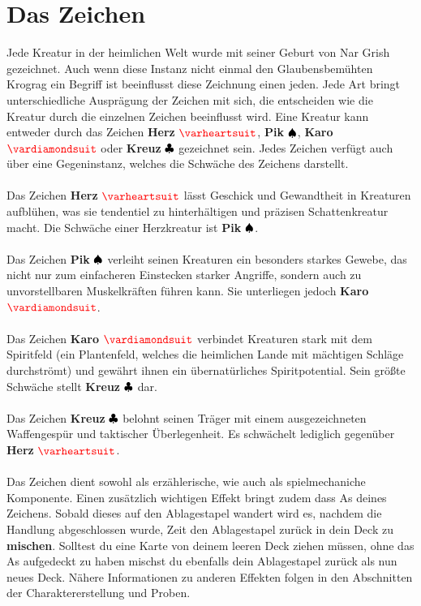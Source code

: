 \section{Das Zeichen}
Jede Kreatur in der heimlichen Welt wurde mit seiner Geburt von Nar Grish gezeichnet. Auch wenn diese Instanz nicht einmal den Glaubensbemühten Krograg ein Begriff ist beeinflusst diese Zeichnung einen jeden. Jede Art bringt unterschiedliche Ausprägung der Zeichen mit sich, die entscheiden wie die Kreatur durch die einzelnen Zeichen beeinflusst wird. Eine Kreatur kann entweder durch das Zeichen \textbf{Herz} $\Herz{}$, \textbf{Pik} ${\color{blue} }{\color{black}\spadesuit}$,  \textbf{Karo} $\Karo{}$ oder \textbf{Kreuz} ${\color{blue} }{\color{black}\clubsuit}$ gezeichnet sein. Jedes Zeichen verfügt auch über eine Gegeninstanz, welches die Schwäche des Zeichens darstellt.\\
\\
Das Zeichen \textbf{Herz} $\Herz{}$ lässt Geschick und Gewandtheit in Kreaturen aufblühen, was sie tendentiel zu hinterhältigen und präzisen Schattenkreatur macht. Die Schwäche einer Herzkreatur ist \textbf{Pik} ${\color{blue} }{\color{black}\spadesuit}$.\\ 
\\
Das Zeichen \textbf{Pik} ${\color{blue} }{\color{black}\spadesuit}$ verleiht seinen Kreaturen ein besonders starkes Gewebe, das nicht nur zum einfacheren Einstecken starker Angriffe, sondern auch zu unvorstellbaren Muskelkräften führen kann. Sie unterliegen jedoch \textbf{Karo} $\Karo{}$.\\
\\
Das Zeichen \textbf{Karo} $\Karo{}$ verbindet Kreaturen stark mit dem Spiritfeld (ein Plantenfeld, welches die heimlichen Lande mit mächtigen Schläge durchströmt) und gewährt ihnen ein übernatürliches Spiritpotential. Sein größte Schwäche stellt \textbf{Kreuz} ${\color{blue} }{\color{black}\clubsuit}{}$ dar.\\
\\
Das Zeichen \textbf{Kreuz} ${\color{blue} }{\color{black}\clubsuit}$ belohnt seinen Träger mit einem ausgezeichneten Waffengespür und taktischer Überlegenheit. Es schwächelt lediglich gegenüber \textbf{Herz} $\Herz{}$.\\
\\
Das Zeichen dient sowohl als erzählerische, wie auch als spielmechaniche Komponente. Einen zusätzlich wichtigen Effekt bringt zudem dass As deines Zeichens. Sobald dieses auf den Ablagestapel wandert wird es, nachdem die Handlung abgeschlossen wurde, Zeit den Ablagestapel zurück in dein Deck zu \textbf{mischen}. Solltest du eine Karte von deinem leeren Deck ziehen müssen, ohne das As aufgedeckt zu haben mischst du ebenfalls dein Ablagestapel zurück als nun neues Deck. Nähere Informationen zu anderen Effekten folgen in den Abschnitten der Charaktererstellung und Proben. 


    

